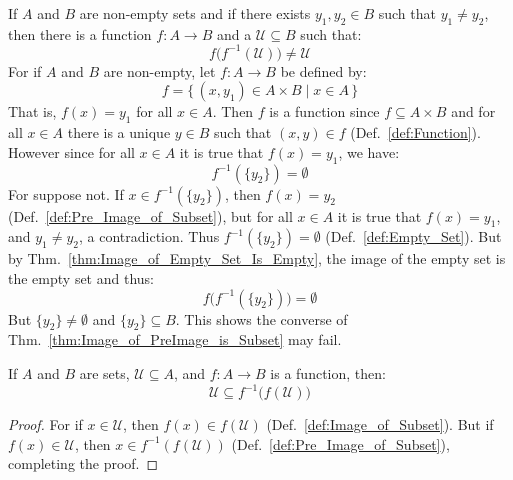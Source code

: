     \begin{example}
        If $A$ and $B$ are non-empty sets and if there exists
        $y_{1},y_{2}\in{B}$ such that $y_{1}\ne{y}_{2}$, then
        there is a function $f:A\rightarrow{B}$ and a
        $\mathcal{U}\subseteq{B}$ such that:
        \begin{equation}
            f\big(f^{-1}(\mathcal{U})\big)\ne\mathcal{U}
        \end{equation}
        For if $A$ and $B$ are non-empty, let $f:A\rightarrow{B}$ be defined by:
        \begin{equation}
            f=\{\,(x,y_{1})\in{A}\times{B}\;|\;x\in{A}\,\}
        \end{equation}
        That is, $f(x)=y_{1}$ for all $x\in{A}$. Then $f$ is a function since
        $f\subseteq{A}\times{B}$ and for all $x\in{A}$ there is a unique
        $y\in{B}$ such that $(x,y)\in{f}$ (Def.~\ref{def:Function}). However
        since for all $x\in{A}$ it is true that $f(x)=y_{1}$, we have:
        \begin{equation}
            f^{\minus{1}}(\{y_{2}\})=\emptyset
        \end{equation}
        For suppose not. If $x\in{f}^{-1}(\{y_{2}\})$, then $f(x)=y_{2}$
        (Def.~\ref{def:Pre_Image_of_Subset}), but for all $x\in{A}$ it is
        true that $f(x)=y_{1}$, and $y_{1}\ne{y}_{2}$, a contradiction. Thus
        $f^{\minus{1}}(\{y_{2}\})=\emptyset$ (Def.~\ref{def:Empty_Set}). But by
        Thm.~\ref{thm:Image_of_Empty_Set_Is_Empty}, the image of the
        empty set is the empty set and thus:
        \begin{equation}
            f\big(f^{-1}(\{y_{2}\})\big)=\emptyset
        \end{equation}
        But $\{y_{2}\}\ne\emptyset$ and $\{y_{2}\}\subseteq{B}$. This shows
        the converse of Thm.~\ref{thm:Image_of_PreImage_is_Subset} may fail.
    \end{example}
    \begin{theorem}
        \label{thm:PreImage_of_Image_is_Superset}%
        If $A$ and $B$ are sets, $\mathcal{U}\subseteq{A}$, and
        $f:A\rightarrow{B}$ is a function, then:
        \begin{equation*}
            \mathcal{U}\subseteq{f}^{\minus{1}}\big(f(\mathcal{U})\big)
        \end{equation*}
    \end{theorem}
    \begin{proof}
        For if $x\in\mathcal{U}$, then $f(x)\in{f}(\mathcal{U})$
        (Def.~\ref{def:Image_of_Subset}). But if $f(x)\in\mathcal{U}$, then
        $x\in{f}^{\minus{1}}(f(\mathcal{U}))$
        (Def.~\ref{def:Pre_Image_of_Subset}), completing the proof.
    \end{proof}
